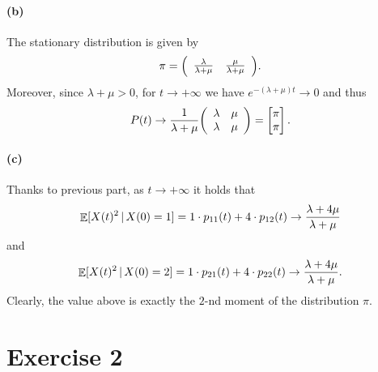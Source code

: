 \documentclass[a4paper,11pt]{article}
\theoremstyle{definition}
\theoremstyle{plain}
\theoremstyle{remark}
\DeclarePairedDelimiter{\parr}{(}{)}
\DeclarePairedDelimiter{\parq}{[}{]}
\DeclareMathOperator*{\expval}{\mathbb{E}}
\begin{document}
\paragraph*{(b)} The stationary distribution is given by
$$
\pi = \parr*{\begin{array}{cc} \frac{\lambda}{\lambda+\mu} & \frac{\mu}{\lambda+\mu} \end{array}}.
$$
Moreover, since $\lambda+\mu>0$, for $t\to+\infty$ we have $e^{-(\lambda+\mu)t}\to 0$ and thus
$$
P(t) \to \frac{1}{\lambda+\mu}\parr*{\begin{array}{cc}
\lambda & \mu \\ \lambda & \mu
\end{array}} = \begin{bmatrix}
\pi \\ \pi
\end{bmatrix}.
$$

\paragraph*{(c)} Thanks to previous part, as $t\to+\infty$ it holds that
$$
\expval\parq{X(t)^2\,|\,X(0)=1} = 1\cdot p_{11}(t) + 4\cdot p_{12}(t) \to \frac{\lambda+4\mu}{\lambda+\mu}
$$
and
$$
\expval\parq{X(t)^2\,|\,X(0)=2} = 1\cdot p_{21}(t) + 4\cdot p_{22}(t) \to \frac{\lambda+4\mu}{\lambda+\mu}.
$$
Clearly, the value above is exactly the $2$-nd moment of the distribution $\pi$.

\section*{Exercise 2}
\end{document}

